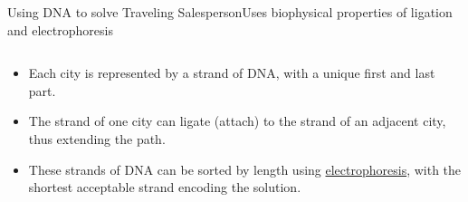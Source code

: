 \begin{frame}{Using DNA to solve Traveling Salesperson}{Uses biophysical properties of ligation and electrophoresis}
    
\begin{columns}
    \begin{column}{0.5\textwidth}
        \begin{itemize}
            \item<1-> Each city is represented by a strand of DNA, with a unique first and last part.
            \item<2-> The strand of one city can ligate (attach) to the strand of an adjacent city, thus extending the path.
            \item<3-> These strands of DNA can be sorted by length using \href{https://en.wikipedia.org/wiki/Gel_electrophoresis}{electrophoresis}, with the shortest acceptable strand encoding the solution.
        \end{itemize}
 
    \end{column}
\end{columns}
\end{frame}
